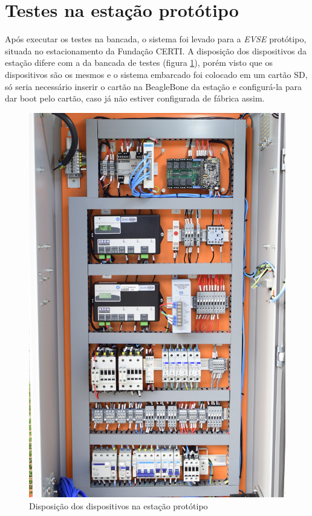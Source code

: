   \section{Testes na estação protótipo}
  \label{tests:evse}

    Após executar os testes na bancada, o sistema foi levado para a \textit{\ac{EVSE}} protótipo, situada no estacionamento da Fundação CERTI. A disposição dos dispositivos da estação difere com a da bancada de testes (figura \ref{fig:setup-evse}), porém visto que os dispositivos são os mesmos e o sistema embarcado foi colocado em um cartão SD, só seria necessário inserir o cartão na BeagleBone da estação e configurá-la para dar boot pelo cartão, caso já não estiver configurada de fábrica assim.

    \begin{figure}[H]
      \begin{center}
        \includegraphics[width=\textwidth,natwidth=1420,natheight=2130]{assets/images/setup-evse.jpg}
        \caption{Disposição dos dispositivos na estação protótipo}
        \label{fig:setup-evse}
      \end{center}
    \end{figure}

